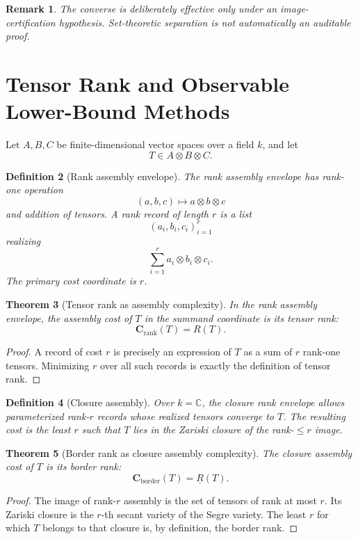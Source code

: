 \documentclass[11pt]{article}
\newtheorem{theorem}{Theorem}[section]
\newtheorem{definition}[theorem]{Definition}
\newtheorem{remark}[theorem]{Remark}
\begin{document}
\begin{remark}
The converse is deliberately effective only under an image-certification hypothesis.  Set-theoretic separation is not automatically an auditable proof.
\end{remark}

\section{Tensor Rank and Observable Lower-Bound Methods}

Let \(A,B,C\) be finite-dimensional vector spaces over a field \(k\), and let
\[
T\in A\otimes B\otimes C.
\]

\begin{definition}[Rank assembly envelope]
The rank assembly envelope has rank-one operation
\[
(a,b,c)\mapsto a\otimes b\otimes c
\]
and addition of tensors.  A rank record of length \(r\) is a list
\[
(a_i,b_i,c_i)_{i=1}^r
\]
realizing
\[
\sum_{i=1}^r a_i\otimes b_i\otimes c_i.
\]
The primary cost coordinate is \(r\).
\end{definition}

\begin{theorem}[Tensor rank as assembly complexity]
In the rank assembly envelope, the assembly cost of \(T\) in the summand coordinate is its tensor rank:
\[
\mathbf C_{\operatorname{rank}}(T)=R(T).
\]
\end{theorem}

\begin{proof}
A record of cost \(r\) is precisely an expression of \(T\) as a sum of \(r\) rank-one tensors.  Minimizing \(r\) over all such records is exactly the definition of tensor rank.
\end{proof}

\begin{definition}[Closure assembly]
Over \(k=\mathbb C\), the closure rank envelope allows parameterized rank-\(r\) records whose realized tensors converge to \(T\).  The resulting cost is the least \(r\) such that \(T\) lies in the Zariski closure of the rank-\(\le r\) image.
\end{definition}

\begin{theorem}[Border rank as closure assembly complexity]
The closure assembly cost of \(T\) is its border rank:
\[
\mathbf C_{\operatorname{border}}(T)=\underline R(T).
\]
\end{theorem}

\begin{proof}
The image of rank-\(r\) assembly is the set of tensors of rank at most \(r\).  Its Zariski closure is the \(r\)-th secant variety of the Segre variety.  The least \(r\) for which \(T\) belongs to that closure is, by definition, the border rank.
\end{proof}
\end{document}
